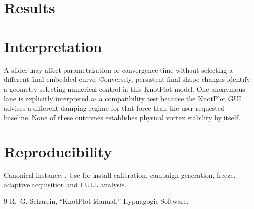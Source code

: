 \documentclass[11pt,a4paper]{article}
\begin{document}
\section{Results}
\section{Interpretation}
A slider may affect parametrization or convergence time without selecting a different final embedded curve. Conversely, persistent final-shape changes identify a geometry-selecting numerical control in this KnotPlot model. One anonymous lane is explicitly interpreted as a compatibility test because the KnotPlot GUI advises a different damping regime for that force than the user-requested baseline. None of these outcomes establishes physical vortex stability by itself.
\section{Reproducibility}
Canonical instance: . Use  for install calibration, campaign generation, freeze, adaptive acquisition and FULL analysis.
\begin{thebibliography}{9}
 R.~G. Scharein, ``KnotPlot Manual,'' Hypnagogic Software.
\end{thebibliography}
\end{document}
